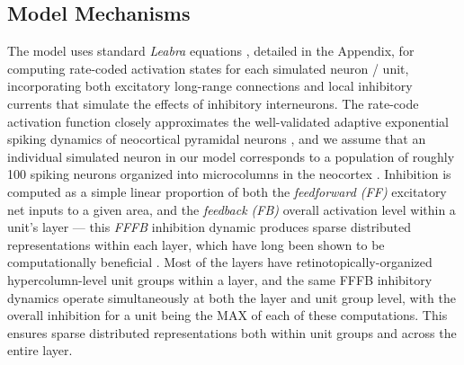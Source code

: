 \documentclass[11pt,twoside]{article}
\newif\myifpdf
\begin{document}
\subsection{Model Mechanisms}
\underline{
}The model uses standard {\em Leabra} equations \cite{OReillyHazyHerd15,OReillyMunakataFrankEtAl12,OReillyMunakata00}, detailed in the Appendix, for computing rate-coded activation states for each simulated neuron / unit, incorporating both excitatory long-range connections and local inhibitory currents that simulate the effects of inhibitory interneurons.  The rate-code activation function closely approximates the well-validated adaptive exponential spiking dynamics of neocortical pyramidal neurons \cite{BretteGerstner05}, and we assume that an individual simulated neuron in our model corresponds to a population of roughly 100 spiking neurons organized into microcolumns in the neocortex \cite{BuxhoevedenCasanova02,Mountcastle57,Mountcastle97,RaoWilliamsGoldman-Rakic99}.  Inhibition is computed as a simple linear proportion of both the {\em feedforward (FF)} excitatory net inputs to a given area, and the {\em feedback (FB)} overall activation level within a unit's layer --- this {\em FFFB} inhibition dynamic produces sparse distributed representations within each layer, which have long been shown to be computationally beneficial \cite{Kanerva88,Barlow89,Field94,OlshausenField97}.  Most of the layers have retinotopically-organized hypercolumn-level unit groups within a layer, and the same FFFB inhibitory dynamics operate simultaneously at both the layer and unit group level, with the overall inhibition for a unit being the MAX of each of these computations.  This ensures sparse distributed representations both within unit groups and across the entire layer.
\end{document}

